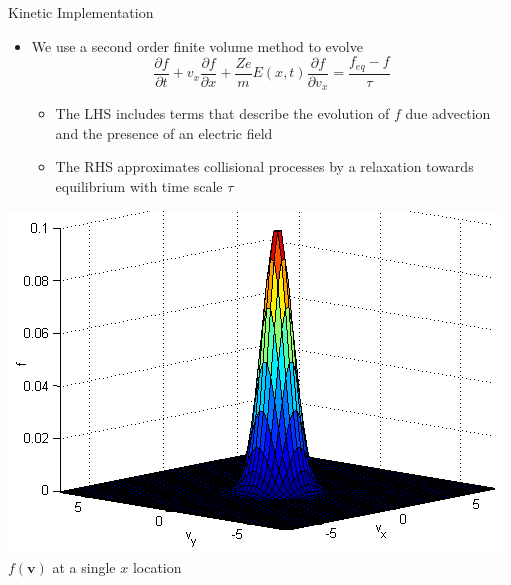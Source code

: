 \documentclass{beamer}
\begin{document}
	\begin{frame}{Kinetic Implementation}
		\begin{itemize}
			\item  We use a second order finite volume method to evolve
			\begin{equation*}
				\frac{\partial f}{\partial t}+v_x\frac{\partial f}{\partial x}+\frac{Z e}{m}E(x,t)\frac{\partial f}{\partial v_x}=\frac{f_{eq}-f}{\tau}
			\end{equation*}
			\begin{itemize}
				\item  The LHS includes terms that describe the evolution of $f$ due advection and the presence of an electric field
				\item The RHS approximates collisional processes by a relaxation towards equilibrium with time scale $\tau$
			\end{itemize}
		\end{itemize}
		\begin{center}
			\includegraphics[height=0.3\textheight]{example_f.png}
			\\\tiny $f(\boldsymbol{v})$ at a single $x$ location
		\end{center}
	\let\thefootnote\relax{}
	\end{frame}
	
	
	
\end{document}
